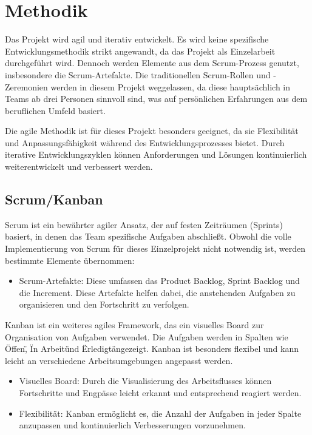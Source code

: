 \newpage

\section{Methodik} 
Das Projekt wird agil und iterativ entwickelt. Es wird keine spezifische Entwicklungsmethodik strikt angewandt, da das Projekt als 
Einzelarbeit durchgeführt wird. Dennoch werden Elemente aus dem Scrum-Prozess genutzt, insbesondere die Scrum-Artefakte. Die traditionellen 
Scrum-Rollen und -Zeremonien werden in diesem Projekt weggelassen, da diese hauptsächlich in Teams ab drei Personen sinnvoll sind, was auf 
persönlichen Erfahrungen aus dem beruflichen Umfeld basiert.

Die agile Methodik ist für dieses Projekt besonders geeignet, da sie Flexibilität und Anpassungsfähigkeit während des Entwicklungsprozesses bietet. 
Durch iterative Entwicklungszyklen können Anforderungen und Lösungen kontinuierlich weiterentwickelt und verbessert werden.

\subsection{ Scrum/Kanban }

Scrum ist ein bewährter agiler Ansatz, der auf festen Zeiträumen (Sprints) basiert, in denen das Team spezifische Aufgaben abschließt. 
Obwohl die volle Implementierung von Scrum für dieses Einzelprojekt nicht notwendig ist, werden bestimmte Elemente übernommen:

\begin{itemize}
    \item Scrum-Artefakte: Diese umfassen das Product Backlog, Sprint Backlog und die Increment. Diese Artefakte helfen dabei, die anstehenden 
    Aufgaben zu organisieren und den Fortschritt zu verfolgen.
\end{itemize}

Kanban ist ein weiteres agiles Framework, das ein visuelles Board zur Organisation von Aufgaben verwendet. Die Aufgaben werden in Spalten 
wie \"Offen\", \"In Arbeit\" und \"Erledigt\" angezeigt. Kanban ist besonders flexibel und kann leicht an verschiedene Arbeitsumgebungen angepasst werden.

\begin{itemize}
    \item Visuelles Board: Durch die Visualisierung des Arbeitsflusses können Fortschritte und Engpässe leicht erkannt und entsprechend reagiert werden.
    \item Flexibilität: Kanban ermöglicht es, die Anzahl der Aufgaben in jeder Spalte anzupassen und kontinuierlich Verbesserungen vorzunehmen.
\end{itemize}

